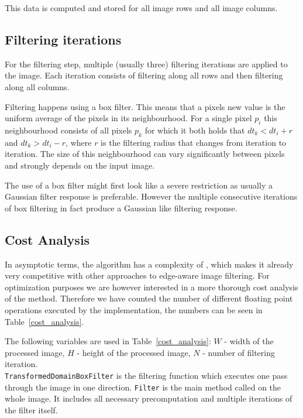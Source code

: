 This data is computed and stored for all image rows and all image columns.

\subsection{Filtering iterations}

For the filtering step, multiple (usually three) filtering iterations are applied to the image. Each iteration consists of filtering along all rows and then filtering along all columns.

Filtering happens using a box filter. This means that a pixels new value is the uniform average of the pixels in its neighbourhood. For a single pixel $p_i$ this neighbourhood consists of all pixels $p_k$ for which it both holds that $dt_k < dt_i+r$ and $dt_k > dt_i-r$, where $r$ is the filtering radius that changes from iteration to iteration. The size of this neighbourhood can vary significantly between pixels and strongly depends on the input image.

The use of a box filter might first look like a severe restriction as usually a Gaussian filter response is preferable. However the multiple consecutive iterations of box filtering in fact produce a Gaussian like filtering response.

\subsection{Cost Analysis}
In asymptotic terms, the algorithm has a complexity of , which makes it already very competitive with other approaches to edge-aware image filtering. For optimization purposes we are however interested in a more thorough cost analysis of the method. Therefore we have counted the number of different floating point operations executed by the implementation, the numbers can be seen in Table~\ref{cost_analysis}.

The following variables are used in Table~\ref{cost_analysis}: $W$ - width of the processed image, $H$ - height of the processed image, $N$ - number of filtering iteration. \\ \lstinline{TransformedDomainBoxFilter} is the filtering function which executes one pass through the image in one direction. \lstinline{Filter} is the main method called on the whole image. It includes all necessary precomputation and multiple iterations of the filter itself.

